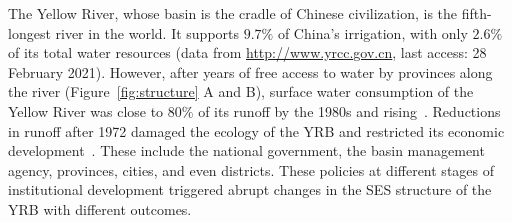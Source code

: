 The Yellow River, whose basin is the cradle of Chinese civilization, is the fifth-longest river in the world. It supports $9.7\%$ of China’s irrigation, with only $2.6\%$ of its total water resources (data from \href{http://www.yrcc.gov.cn}{http://www.yrcc.gov.cn}, last access: 28 February 2021).
However, after years of free access to water by provinces along the river (Figure~\ref{fig:structure} A and B), surface water consumption of the Yellow River was close to $80\%$ of its runoff by the 1980s and rising~\cite{wangYellowRiverwater2019,songSedimenttransportincreasing2020}.
Reductions in runoff after 1972 damaged the ecology of the YRB and restricted its economic development~\cite{wangYellowRiverwater2019}.
These include the national government, the basin management agency, provinces, cities, and even districts.
These policies at different stages of institutional development triggered abrupt changes in the SES structure of the YRB with different outcomes.

